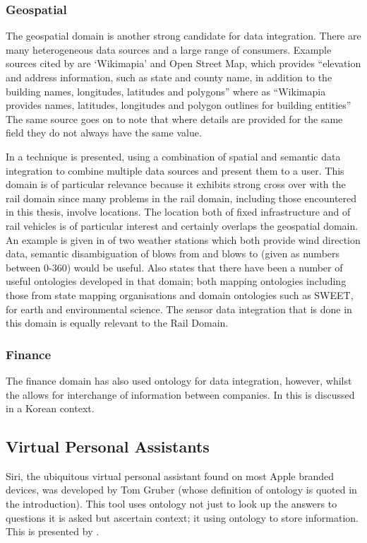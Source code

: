 \subsubsection{Geospatial}
The geospatial domain is another strong candidate for data integration. There are many heterogeneous data sources and a large range of consumers. Example sources cited by \citet{Zhang2013} are `Wikimapia' and Open Street Map, which provides ``elevation and address information, such as state and county name, in addition to the building names, longitudes, latitudes and polygons'' where as  ``Wikimapia provides names, latitudes, longitudes and polygon outlines for building entities'' The same source goes on to note that where details are provided for the same field they do not always have the same value. 

In \citet{Zhang2013} a technique is presented, using a combination of spatial and semantic data integration to combine multiple data sources and present them to a user. This domain is of particular relevance because it exhibits strong cross over with the rail domain since many problems in the rail domain, including those encountered in this thesis, involve locations. The location both of fixed infrastructure and of rail vehicles is of particular interest and certainly overlaps the geospatial domain. An example is given in \citet{Janowicz2012} of two weather stations which both provide wind direction data, semantic disambiguation of blows from and blows to (given as numbers between 0-360) would be useful. \citet{Janowicz2012} Also states that there have been a number of useful ontologies developed in that domain; both mapping ontologies including those from state mapping organisations and domain ontologies such as SWEET, for earth and environmental science. The sensor data integration that is done in this domain is equally relevant to the Rail Domain.
\subsubsection{Finance}
The finance domain has also used ontology for data integration, however, whilst the  allows for interchange of information between companies. In \citet{Kim2004} this is discussed in a Korean context.
\subsection{Virtual Personal Assistants}
Siri, the ubiquitous virtual personal assistant found on most Apple branded devices, was developed by Tom Gruber (whose definition of ontology is quoted in the introduction). This tool uses ontology not just to look up the answers to questions it is asked but ascertain context; it using ontology to store information. This is presented by \citet{Gruber2009}.

